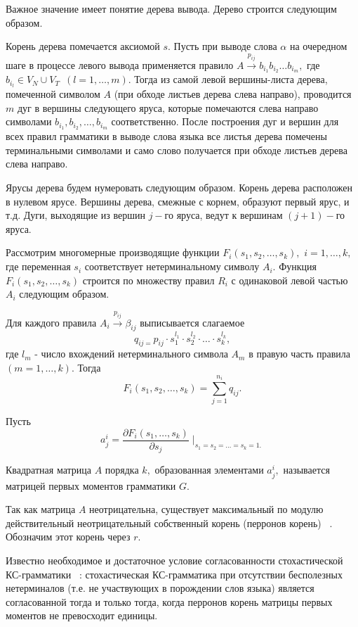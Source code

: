 \documentclass[10pt]{article}
\begin{document}
Важное значение имеет понятие дерева вывода. Дерево строится
следующим образом.

Корень дерева помечается аксиомой $s.$
Пусть при выводе слова $\alpha$ на очередном шаге в процессе левого вывода
применяется правило
$A \stackrel{p_{ij}}{\rightarrow } b_{i_1} b_{i_2}\ldots b_{i_m},$
где $b_{i_l} \in {V_N \cup V_T}$ $\,(l=1,\ldots,m).$
Тогда из самой левой вершины-листа дерева,
помеченной символом $A$ (при обходе листьев дерева слева направо),
проводится $m$ дуг в вершины следующего яруса, которые помечаются
слева направо символами $b_{i_1}, b_{i_2},\ldots, b_{i_m}$ соответственно.
После построения дуг и вершин для всех правил грамматики в выводе слова языка
все листья дерева помечены терминальными символами и само слово получается
при обходе листьев дерева слева направо.

Ярусы дерева будем нумеровать следующим образом.
Корень дерева расположен в нулевом ярусе. Вершины дерева,
смежные с корнем, образуют первый ярус, и т.д.
Дуги, выходящие из вершин $j-$го яруса, ведут к вершинам $(j+1)-$го яруса.

Рассмотрим многомерные производящие функции
$F_i( s_1,s_2,\ldots ,s_k) ,\,\,i=1,\ldots ,k,$
где переменная $s_i$ соответствует нетерминальному символу $A_i.$
Функция $F_i( s_1,s_2,\ldots ,s_k) $ строится по множеству правил $R_i$ с
одинаковой левой частью $A_i$ следующим образом.

Для каждого правила $A_i\stackrel{p_{ij}}{\rightarrow }\beta_{ij}$
выписывается слагаемое
$$
q_{ij=}p_{ij}\cdot s_1^{l_1}\cdot s_2^{l_2}\cdot \ldots \cdot s_k^{l_k},
$$
где $l_m$ - число вхождений нетерминального символа $A_m$ в правую часть
правила $(m=1, \ldots ,k).$
Тогда
$$
F_i( s_1,s_2,\ldots ,s_k) =\sum_{j=1}^{n_i}q_{ij}.
$$

Пусть
$$
a^{i}_{j}=\frac{\partial F_i( s_1,\ldots ,s_k) }{\partial s_j}\mid
_{s_1=s_2=\ldots =s_k=1.}
$$

Квадратная матрица $A$ порядка $k,$ образованная элементами $a^{i}_{j},$
называется матрицей первых моментов грамматики $G.$

Так как матрица $A$ неотрицательна, существует максимальный по модулю
действительный неотрицательный собственный корень (перронов корень) ~\cite{zhilbib7}.
Обозначим этот корень через $r$.

Известно необходимое и достаточное условие согласованности стохастической
КС-грамматики ~\cite{zhilbib6}:
стохастическая КС-грамматика при отсутствии бесполезных нетерминалов
(т.е. не участвующих в порождении слов языка) является согласованной тогда
и только тогда, когда перронов корень матрицы первых моментов не превосходит
единицы.
\end{document}
